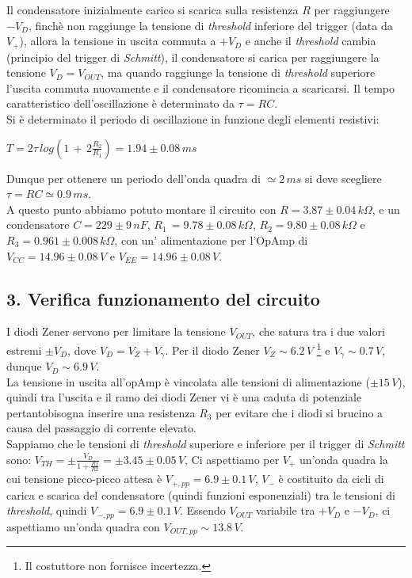 \documentclass[10pt,a4paper]{article}
\begin{document}
Il condensatore inizialmente carico si scarica sulla resistenza $R$ per raggiungere $-V_D$, finchè non raggiunge la tensione di \emph{threshold} inferiore del trigger (data da $V_{+}$), allora la tensione in uscita commuta a $+V_{D}$ e anche il \emph{threshold} cambia (principio del trigger di \emph{Schmitt}), il condensatore si carica per raggiungere la tensione $V_D = V_{OUT}$, ma quando raggiunge la tensione di \emph{threshold} superiore l'uscita commuta nuovamente e il condensatore ricomincia a scaricarsi. Il tempo caratteristico dell'oscillazione è determinato da $\tau = RC$.\\

Si è determinato il periodo di oscillazione in funzione degli elementi resistivi: 
\begin{center}
$T=2\tau\, log\left( 1\,+\,2\frac{R_2}{R_1}\right) = 1.94 \pm 0.08 \, ms$ 
\end{center}
Dunque per ottenere un periodo dell'onda quadra di $\simeq 2 \, ms$ si deve scegliere $\tau = RC\simeq 0.9\,ms$.\\
A questo punto abbiamo potuto montare il circuito con $R = 3.87 \pm 0.04 \, k\Omega$, e un condensatore $C = 229 \pm 9 \, nF$, $R_1\,= 9.78\pm0.08 \, k\Omega $, $R_2 = 9.80\pm0.08\, k\Omega $ e $R_3 = 0.961\pm0.008 \, k\Omega $, con un' alimentazione per l'OpAmp di $V_{CC} = 14.96\pm0.08 \, V$ e $V_{EE} = 14.96 \pm 0.08 \, V$.


\subsection*{3. Verifica funzionamento del circuito}

I diodi Zener servono per limitare la tensione $V_{OUT}$, che satura tra i due valori estremi $\pm V_{D}$, dove $V_{D} = V_{Z} + V_{ \gamma}$. Per il diodo Zener $V_Z \sim 6.2 \, V$ \footnote{Il costuttore non fornisce incertezza.} e $V_{\gamma} \sim 0.7\, V$, dunque $V_D \sim 6.9 \, V$. \\
La tensione in uscita all'opAmp è vincolata alle tensioni di alimentazione ($\pm 15 \, V$), quindi tra l'uscita e il ramo dei diodi Zener vi è una caduta di potenziale pertantobisogna inserire una resistenza $R_3$ per evitare che i diodi si brucino a causa del passaggio di corrente elevato. \\ 

Sappiamo che le tensioni di \emph{threshold} superiore e inferiore per il trigger di \emph{Schmitt} sono: $V_{TH} = \pm \frac{V_{D}}{1+\frac{R1}{R2}} = \pm 3.45 \pm 0.05 \, V$, 
Ci aspettiamo per $V_{+}$ un'onda quadra la cui tensione picco-picco attesa è $V_{+, pp} = 6.9 \pm 0.1 \, V$, $V_{-}$ è costituito da cicli di carica e scarica del condensatore (quindi funzioni esponenziali) tra le tensioni di \emph{threshold}, quindi $V_{-, pp} = 6.9 \pm 0.1 \, V$. Essendo $V_{OUT}$ variabile tra $+V_{D}$ e $-V_{D}$, ci aspettiamo un'onda quadra con $V_{OUT, pp} \sim 13.8 \, V$.
\end{document}
